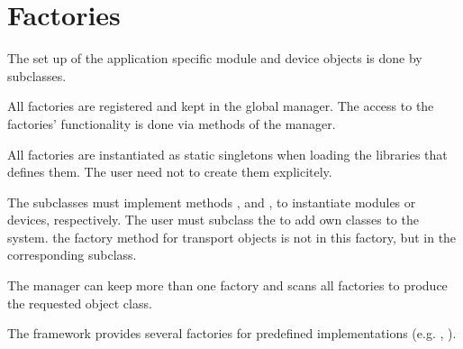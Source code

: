 \section{Factories}
The set up of the application specific module and device objects is done 
   by  subclasses.
\begin{compactenum}
\item  All factories are registered and kept in the global manager. 
      The access to the factories' functionality is done via methods of the manager. 
\item  All factories are instantiated as static singletons when 
      loading the libraries that defines them. 
      The user need not to create them explicitely.       
\item  The  subclasses must implement methods , 
      and  , to instantiate modules or 
      devices, respectively. The user must subclass 
      the  to add own classes to the system.  the factory 
      method for transport objects is not in this factory, but in the 
      corresponding  subclass. 
\item  The manager can keep more than one factory and scans 
      all factories to produce the requested object class. 
\item  The framework provides several factories for predefined 
      implementations (e.g. , ).      
\end{compactenum}

